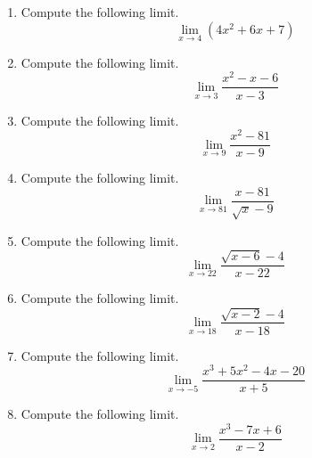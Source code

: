 \documentclass{article}
\begin{document}
\ActivityTitle[class=Calculus I, number=1, name=Limits]

\begin{enumerate}
\item Compute the following limit. \[ \lim_{x \rightarrow 4} \left( 4 x^2 + 6 x + 7 \right) \]



  
\vspace{5cm}

\item Compute the following limit. \[ \displaystyle\lim_{x \rightarrow 3} \frac{x^2 - x - 6}{x - 3} \]



  
\vspace{5cm}

\item Compute the following limit. \[ \lim_{x \rightarrow 9} \frac{x^2 - 81}{x - 9} \]



  
\vspace{5cm}

\item Compute the following limit. \[ \lim_{x \rightarrow 81} \frac{x - 81}{\sqrt{x} - 9} \]



  
\vspace{5cm}

\item Compute the following limit. \[ \lim_{x \rightarrow 22} \frac{\sqrt{x - 6} - 4}{x - 22} \]



  
\vspace{5cm}

\item Compute the following limit. \[ \lim_{x \rightarrow 18} \frac{\sqrt{x - 2} - 4}{x - 18} \]



  
\vspace{5cm}

\item Compute the following limit. \[ \lim_{x \rightarrow -5} \frac{x^3 + 5x^2 - 4x - 20}{x + 5} \]



  
\vspace{5cm}

\item Compute the following limit. \[ \lim_{x \rightarrow 2} \frac{x^3 - 7x + 6}{x - 2} \]



  
\vspace{5cm}
\end{enumerate}
\end{document}
